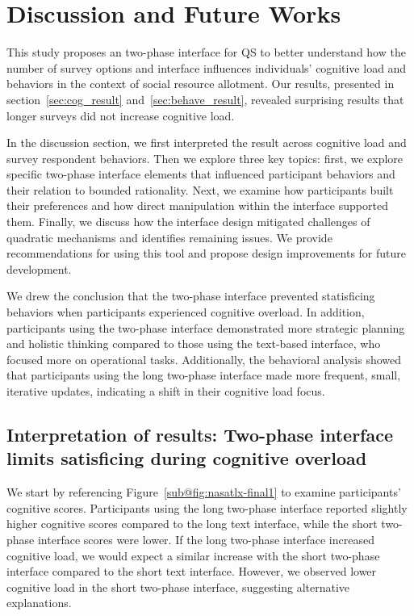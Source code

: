 \section{Discussion and Future Works}
\label{sec:discussion}
This study proposes an two-phase interface for QS to better understand how the number of survey options and interface influences individuals' cognitive load and behaviors in the context of social resource allotment. Our results, presented in section~\ref{sec:cog_result} and~\ref{sec:behave_result}, revealed surprising results that longer surveys did not increase cognitive load.

In the discussion section, we first interpreted the result across cognitive load and survey respondent behaviors. Then we explore three key topics: first, we explore specific two-phase interface elements that influenced participant behaviors and their relation to bounded rationality. Next, we examine how participants built their preferences and how direct manipulation within the interface supported them. Finally, we discuss how the interface design mitigated challenges of quadratic mechanisms and identifies remaining issues. We provide recommendations for using this tool and propose design improvements for future development.

We drew the conclusion that the two-phase interface prevented statisficing behaviors when participants experienced cognitive overload. In addition, participants using the two-phase interface demonstrated more strategic planning and holistic thinking compared to those using the text-based interface, who focused more on operational tasks. Additionally, the behavioral analysis showed that participants using the long two-phase interface made more frequent, small, iterative updates, indicating a shift in their cognitive load focus.

\subsection{Interpretation of results: Two-phase interface limits satisficing during cognitive overload} \label{sec:satisficing}
We start by referencing Figure~\ref{sub@fig:nasatlx-final1} to examine participants' cognitive scores. Participants using the long two-phase interface reported slightly higher cognitive scores compared to the long text interface, while the short two-phase interface scores were lower. If the long two-phase interface increased cognitive load, we would expect a similar increase with the short two-phase interface compared to the short text interface. However, we observed lower cognitive load in the short two-phase interface, suggesting alternative explanations.

